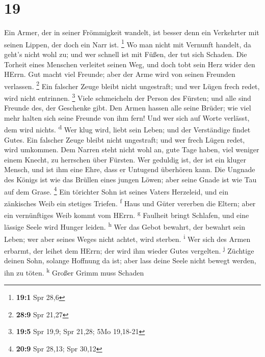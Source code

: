 \hypertarget{section-18}{%
\section{19}\label{section-18}}

 Ein Armer, der in seiner Frömmigkeit wandelt, ist besser
denn ein Verkehrter mit seinen Lippen, der doch ein Narr ist.
\footnote{\textbf{19:1} Spr 28,6}  Wo man nicht mit
Vernunft handelt, da geht's nicht wohl zu; und wer schnell ist mit
Füßen, der tut sich Schaden.  Die Torheit eines Menschen
verleitet seinen Weg, und doch tobt sein Herz wider den HErrn.
 Gut macht viel Freunde; aber der Arme wird von seinen
Freunden verlassen. \footnote{\textbf{28:9} Spr 21,27} 
Ein falscher Zeuge bleibt nicht ungestraft; und wer Lügen frech redet,
wird nicht entrinnen. \footnote{\textbf{19:5} Spr 19,9; Spr 21,28; 5Mo
  19,18-21}  Viele schmeicheln der Person des Fürsten; und
alle sind Freunde des, der Geschenke gibt.  Den Armen
hassen alle seine Brüder; wie viel mehr halten sich seine Freunde von
ihm fern! Und wer sich auf Worte verlässt, dem wird nichts.
\textsuperscript{d}  Wer klug wird, liebt sein Leben; und
der Verständige findet Gutes.  Ein falscher Zeuge bleibt
nicht ungestraft; und wer frech Lügen redet, wird umkommen.
 Dem Narren steht nicht wohl an, gute Tage haben, viel
weniger einem Knecht, zu herrschen über Fürsten.  Wer
geduldig ist, der ist ein kluger Mensch, und ist ihm eine Ehre, dass er
Untugend überhören kann.  Die Ungnade des Königs ist wie
das Brüllen eines jungen Löwen; aber seine Gnade ist wie Tau auf dem
Grase. \footnote{\textbf{20:9} Spr 28,13; Spr 30,12}  Ein
törichter Sohn ist seines Vaters Herzeleid, und ein zänkisches Weib ein
stetiges Triefen. \textsuperscript{f}  Haus und Güter
vererben die Eltern; aber ein vernünftiges Weib kommt vom HErrn.
\textsuperscript{g}  Faulheit bringt Schlafen, und eine
lässige Seele wird Hunger leiden. \textsuperscript{h} 
Wer das Gebot bewahrt, der bewahrt sein Leben; wer aber seines Weges
nicht achtet, wird sterben. \textsuperscript{i}  Wer sich
des Armen erbarmt, der leihet dem HErrn; der wird ihm wieder Gutes
vergelten. \textsuperscript{j}  Züchtige deinen Sohn,
solange Hoffnung da ist; aber lass deine Seele nicht bewegt werden, ihn
zu töten. \textsuperscript{k}  Großer Grimm muss Schaden

